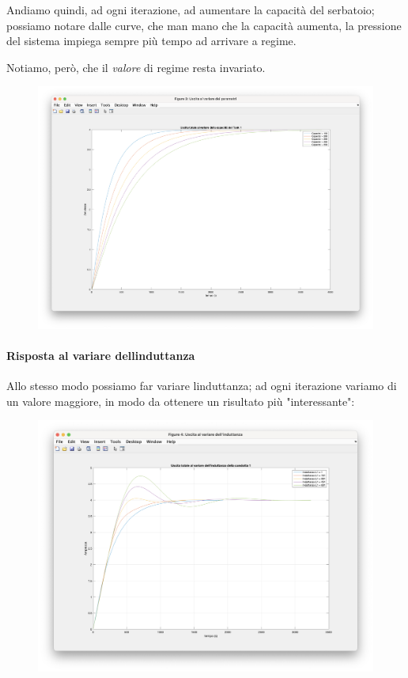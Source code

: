 \documentclass[
]{article}
\begin{document}
Andiamo quindi, ad ogni iterazione, ad aumentare la capacità del
serbatoio; possiamo notare dalle curve, che man mano che la capacità
aumenta, la pressione del sistema impiega sempre più tempo ad arrivare a
regime.

Notiamo, però, che il \emph{valore} di regime resta invariato.

\begin{figure}
    \centering
    \includegraphics[width=0.7\linewidth]{images/image-20240106113124504.png}
    
    
\end{figure}

\hypertarget{risposta-al-variare-dellinduttanza}{%
\paragraph{Risposta al variare
dell\textquotesingle induttanza}\label{risposta-al-variare-dellinduttanza}}

Allo stesso modo possiamo far variare l\textquotesingle induttanza; ad
ogni iterazione variamo di un valore maggiore, in modo da ottenere un
risultato più "interessante":

\begin{figure}
    \centering
    \includegraphics[width=0.7\linewidth]{images/image-20240107210446106.png}
    
    
\end{figure}
\end{document}
